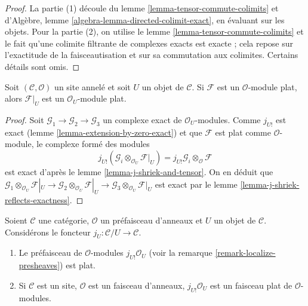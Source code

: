 \begin{proof}

La partie (1) découle du lemme \ref{lemma-tensor-commute-colimits} et
d'Algèbre, lemme \ref{algebra-lemma-directed-colimit-exact}, en évaluant
sur les objets. Pour la partie (2), on utilise le lemme
\ref{lemma-tensor-commute-colimits} et le fait qu'une colimite filtrante de
complexes exacts est exacte ; cela repose sur l'exactitude de la
faisceautisation et sur sa commutation aux colimites. Certains détails sont
omis.

\end{proof}

\begin{lemma}

\label{lemma-restriction-flat}
Soit $(\mathcal{C}, \mathcal{O})$ un site annelé et soit $U$ un objet de
$\mathcal{C}$. Si $\mathcal{F}$ est un $\mathcal{O}$-module plat, alors
$\mathcal{F}|_U$ est un $\mathcal{O}_U$-module plat.
\end{lemma}

\begin{proof}
Soit $\mathcal{G}_1 \to \mathcal{G}_2 \to \mathcal{G}_3$ un complexe exact
de $\mathcal{O}_U$-modules. Comme $j_{U!}$ est exact (lemme
\ref{lemma-extension-by-zero-exact}) et que $\mathcal{F}$ est plat comme
$\mathcal{O}$-module, le complexe formé des modules
$$
j_{U!}(\mathcal{G}_i \otimes_{\mathcal{O}_U} \mathcal{F}|_U) =
j_{U!}\mathcal{G}_i \otimes_\mathcal{O} \mathcal{F}
$$
est exact d'après le lemme \ref{lemma-j-shriek-and-tensor}. On en déduit que
$\mathcal{G}_1 \otimes_{\mathcal{O}_U} \mathcal{F}|_U \to
\mathcal{G}_2 \otimes_{\mathcal{O}_U} \mathcal{F}|_U \to
\mathcal{G}_3 \otimes_{\mathcal{O}_U} \mathcal{F}|_U$ est exact par le lemme \ref{lemma-j-shriek-reflects-exactness}.
\end{proof}

\begin{lemma}

\label{lemma-j-shriek-flat}

Soient $\mathcal{C}$ une catégorie, $\mathcal{O}$ un préfaisceau d'anneaux
et $U$ un objet de $\mathcal{C}$. Considérons le foncteur
$j_U : \mathcal{C}/U \to \mathcal{C}$.

\begin{enumerate}

\item Le préfaisceau de $\mathcal{O}$-modules
$j_{U!}\mathcal{O}_U$ (voir la remarque
\ref{remark-localize-presheaves}) est plat.
\item Si $\mathcal{C}$ est un site, $\mathcal{O}$ est un faisceau d'anneaux,
$j_{U!}\mathcal{O}_U$ est un faisceau plat de $\mathcal{O}$-modules.

\end{enumerate}

\end{lemma}


